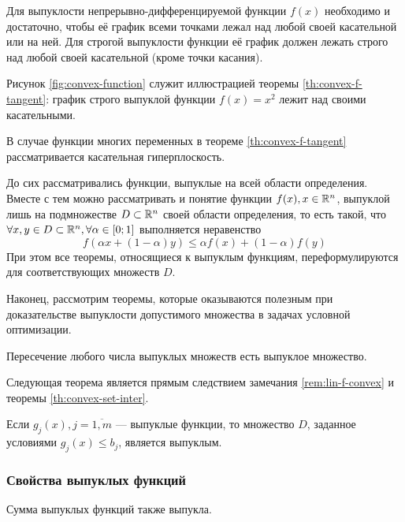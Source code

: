 \begin{thm}
  \label{th:convex-f-tangent}
  Для выпуклости непрерывно-дифференцируемой функции $f(x)$ необходимо
  и достаточно, чтобы её график всеми точками лежал над любой своей
  касательной или на ней. Для строгой выпуклости функции её график
  должен лежать строго над любой своей касательной (кроме точки
  касания).
\end{thm}
Рисунок \ref{fig:convex-function} служит иллюстрацией теоремы
\ref{th:convex-f-tangent}: график строго выпуклой функции $f(x) = x^2$
лежит над своими касательными.

В случае функции многих переменных в теореме \ref{th:convex-f-tangent}
рассматривается касательная гиперплоскость.

\begin{rem}
  До сих рассматривались функции, выпуклые на всей области
  определения. Вместе с тем можно рассматривать и понятие функции
  $f(x), x \in \mathbb{R}^n$, выпуклой лишь на подмножестве $D \subset
  \mathbb{R}^n$ своей области определения, то есть такой, что $\forall x,
  y \in D\subset \mathbb{R}^n, \forall \alpha \in [0;1]$ выполняется
  неравенство
  \begin{equation*}
    f(\alpha x + (1-\alpha)y) \leq \alpha f(x) + (1-\alpha) f(y)
  \end{equation*}
  При этом все теоремы, относящиеся к выпуклым функциям,
  переформулируются для соответствующих множеств $D$.
\end{rem}

Наконец, рассмотрим теоремы, которые оказываются полезным при
доказательстве выпуклости допустимого множества в задачах условной
оптимизации.
\begin{thm}
  \label{th:convex-set-inter}
  Пересечение любого числа выпуклых множеств есть выпуклое множество.
\end{thm}
Следующая теорема является прямым следствием замечания
\ref{rem:lin-f-convex} и теоремы \ref{th:convex-set-inter}.
\begin{thm}
  \label{th:convex-set}
  Если $g_j(x), j=\overline{1,m}$ — выпуклые функции, то множество
  $D$, заданное условиями $g_j(x) \leq b_j$, является выпуклым.
\end{thm}

\subsubsection{Свойства выпуклых функций}
\begin{thm}
  \label{th:convex-f-sum}
  Сумма выпуклых функций также выпукла.
\end{thm}

